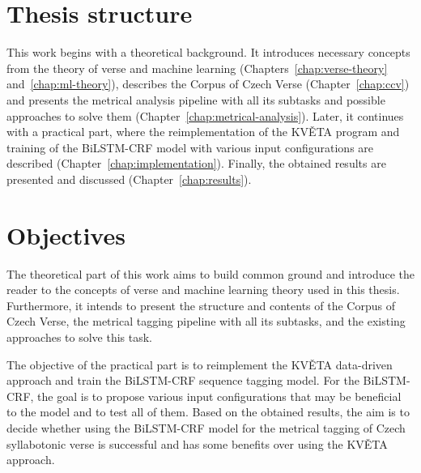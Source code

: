 \section*{Thesis structure}
This work begins with a theoretical background. It introduces necessary concepts from the theory of verse and machine learning (Chapters~\ref{chap:verse-theory} and~\ref{chap:ml-theory}), describes the Corpus of Czech Verse (Chapter~\ref{chap:ccv}) and presents the metrical analysis pipeline with all its subtasks and possible approaches to solve them (Chapter~\ref{chap:metrical-analysis}). Later, it continues with a practical part, where the reimplementation of the KVĚTA program and training of the BiLSTM-CRF model with various input configurations are described (Chapter~\ref{chap:implementation}). Finally, the obtained results are presented and discussed (Chapter~\ref{chap:results}).

\section*{Objectives}
The theoretical part of this work aims to build common ground and introduce the reader to the concepts of verse and machine learning theory used in this thesis. Furthermore, it intends to present the structure and contents of the Corpus of Czech Verse, the metrical tagging pipeline with all its subtasks, and the existing approaches to solve this task.

The objective of the practical part is to reimplement the KVĚTA data-driven approach and train the BiLSTM-CRF sequence tagging model. For the BiLSTM-CRF, the goal is to propose various input configurations that may be beneficial to the model and to test all of them. Based on the obtained results, the aim is to decide whether using the BiLSTM-CRF model for the metrical tagging of Czech syllabotonic verse is successful and has some benefits over using the KVĚTA approach.